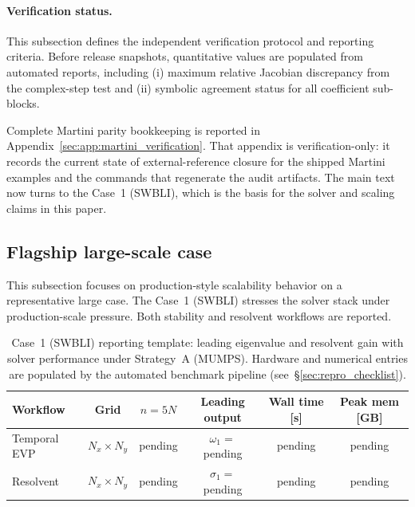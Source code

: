 \documentclass[11pt]{article}
\begin{document}
\paragraph{Verification status.}
This subsection defines the independent verification protocol and reporting criteria.
Before release snapshots, quantitative values are populated from automated reports, including (i) maximum relative Jacobian discrepancy from the complex-step test and (ii) symbolic agreement status for all coefficient sub-blocks.

Complete Martini parity bookkeeping is reported in Appendix~\ref{sec:app:martini_verification}.
That appendix is verification-only: it records the current state of external-reference closure for the shipped Martini examples and the commands that regenerate the audit artifacts.
The main text now turns to the Case~1 (SWBLI), which is the basis for the solver and scaling claims in this paper.

\subsection{Flagship large-scale case}
\label{sec:case1}

This subsection focuses on production-style scalability behavior on a representative large case.
The Case~1 (SWBLI) stresses the solver stack under production-scale pressure.
Both stability and resolvent workflows are reported.

\begin{table}[t]
\centering
\small
\begin{tabular}{lccccc}
\toprule
Workflow & Grid & $n = 5N$ & Leading output & Wall time [s] & Peak mem [GB] \\
\midrule
Temporal EVP & $N_x \times N_y$ & pending & $\omega_1 =$ pending & pending & pending \\
Resolvent    & $N_x \times N_y$ & pending & $\sigma_1 =$ pending & pending & pending \\
\bottomrule
\end{tabular}
\caption{Case~1 (SWBLI) reporting template: leading eigenvalue and resolvent gain with solver performance under Strategy~A (MUMPS). Hardware and numerical entries are populated by the automated benchmark pipeline (see~\S\ref{sec:repro_checklist}).}
\label{tab:case1}
\end{table}
\end{document}
